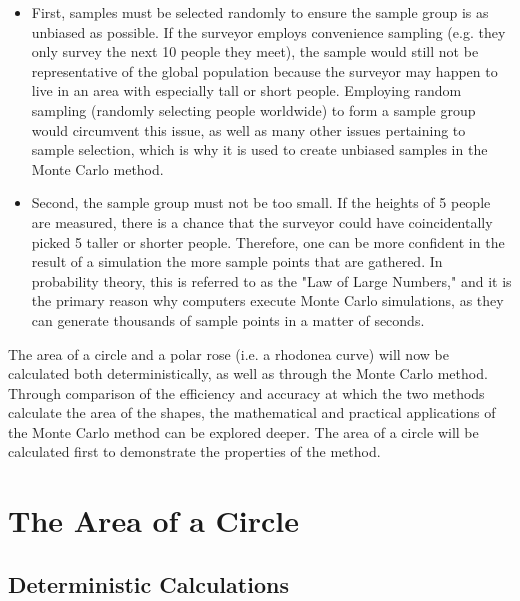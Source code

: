 \documentclass[11pt]{article}
\begin{document}
\begin{itemize}

  \item First, samples must be selected randomly to ensure the sample group is as unbiased as possible. If the surveyor employs convenience sampling (e.g. they only survey the next 10 people they meet), the sample would still not be representative of the global population because the surveyor may happen to live in an area with especially tall or short people. Employing random sampling (randomly selecting people worldwide) to form a sample group would circumvent this issue, as well as many other issues pertaining to sample selection, which is why it is used to create unbiased samples in the Monte Carlo method.

  \item Second, the sample group must not be too small. If the heights of 5 people are measured, there is a chance that the surveyor could have coincidentally picked 5 taller or shorter people. Therefore, one can be more confident in the result of a simulation the more sample points that are gathered. In probability theory, this is referred to as the "Law of Large Numbers," and it is the primary reason why computers execute Monte Carlo simulations, as they can generate thousands of sample points in a matter of seconds.

\end{itemize}

The area of a circle and a polar rose (i.e. a rhodonea curve) will now be calculated both deterministically, as well as through the Monte Carlo method. Through comparison of the efficiency and accuracy at which the two methods calculate the area of the shapes, the mathematical and practical applications of the Monte Carlo method can be explored deeper. The area of a circle will be calculated first to demonstrate the properties of the method.

\section{The Area of a Circle}
\subsection{Deterministic Calculations}
\end{document}
